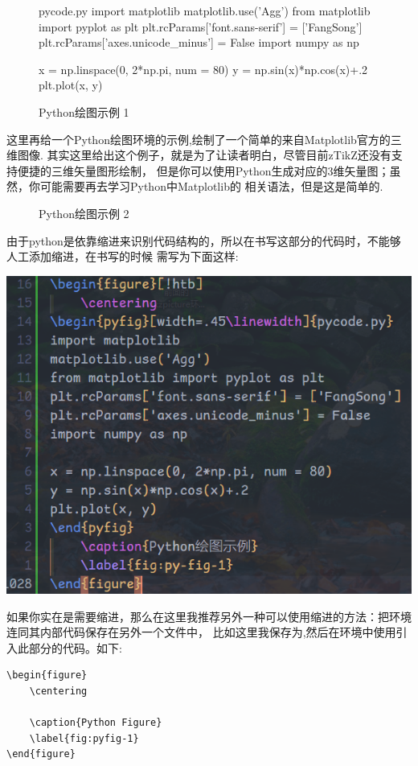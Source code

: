 \begin{figure}[!htb]
    \centering
\begin{pyfig}[width=.75\linewidth]{pycode.py}
import matplotlib 
matplotlib.use('Agg')
from matplotlib import pyplot as plt
plt.rcParams['font.sans-serif'] = ['FangSong']  
plt.rcParams['axes.unicode_minus'] = False
import numpy as np

x = np.linspace(0, 2*np.pi, num = 80)
y = np.sin(x)*np.cos(x)+.2
plt.plot(x, y)
\end{pyfig}
    \caption{Python绘图示例 1}
    \label{fig:py-fig-1}
\end{figure}

这里再给一个Python绘图环境的示例,绘制了一个简单的来自Matplotlib官方的三维图像. 
其实这里给出这个例子，就是为了让读者明白，尽管目前zTikZ还没有支持便捷的三维矢量图形绘制，
但是你可以使用Python生成对应的3维矢量图；虽然，你可能需要再去学习Python中Matplotlib的
相关语法，但是这是简单的.

\begin{figure}[!htb]
    \centering
    
    \caption{Python绘图示例 2}
    \label{fig:py-fig-2}
\end{figure}

\begin{remark}
由于python是依靠缩进来识别代码结构的，所以在书写这部分的代码时，不能够人工添加缩进，在书写的时候
需写为下面这样:
\begin{center}
    \includegraphics[width=.45\linewidth]{./pics/pyfig_example.png}
\end{center}

如果你实在是需要缩进，那么在这里我推荐另外一种可以使用缩进的方法：把环境连同其内部代码保存在另外一个文件中，
比如这里我保存为,然后在环境中使用\cmd{}引入此部分的代码。如下:
\begin{verbatim}
\begin{figure}
    \centering
    
    \caption{Python Figure}
    \label{fig:pyfig-1}
\end{figure}
\end{verbatim}
\end{remark}


